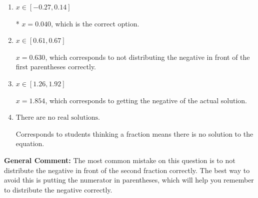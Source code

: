\documentclass{extbook}[14pt]
\begin{document}
\begin{enumerate}
{\begin{enumerate}[label=\Alph*.]
$x = -0.630$, which corresponds to not distributing the negative in front of the second parentheses correctly.
\item \( x \in [-0.27, 0.14] \)

* $x = 0.040$, which is the correct option.
\item \( x \in [0.61, 0.67] \)

$x = 0.630$, which corresponds to not distributing the negative in front of the first parentheses correctly.
\item \( x \in [1.26, 1.92] \)

$x = 1.854$, which corresponds to getting the negative of the actual solution.
\item \( \text{There are no real solutions.} \)

Corresponds to students thinking a fraction means there is no solution to the equation.
\end{enumerate}

\textbf{General Comment:} The most common mistake on this question is to not distribute the negative in front of the second fraction correctly. The best way to avoid this is putting the numerator in parentheses, which will help you remember to distribute the negative correctly.
}
\end{enumerate}
\end{document}
